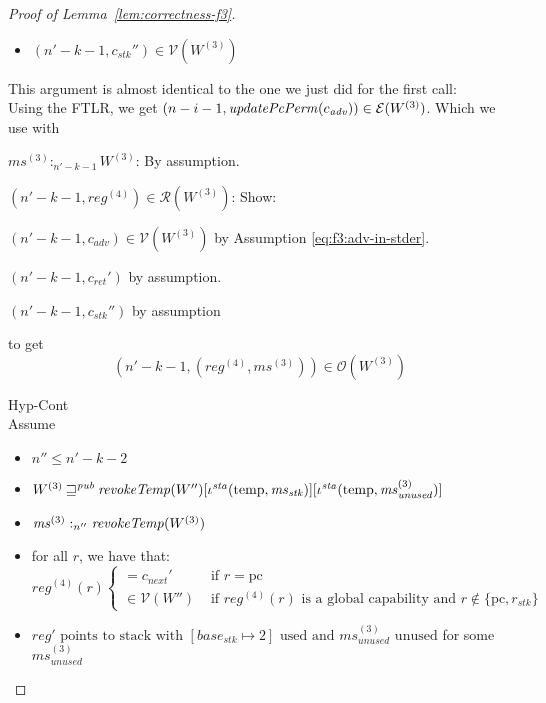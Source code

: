 \documentclass[a4paper]{article}
\newcommand{\var}[1]{\mathit{#1}}
\newcommand{\hs}{\var{ms}}
\newcommand{\ms}{\hs}
\newcommand{\pcreg}{\mathrm{pc}}
\newcommand{\start}{\var{base}}
\newcommand{\reg}{\var{reg}}
\newcommand{\heap}{\var{mem}}
\newcommand{\adv}{\var{adv}}
\newcommand{\stk}{\var{stk}}
\newcommand{\sta}{\var{sta}}
\newcommand{\plainfun}[2]{
  \ifthenelse{\equal{#2}{}}
  {\mathit{#1}}
  {\mathit{#1}(#2)}
}
\newcommand{\updatePcPerm}[1]{\plainfun{updatePcPerm}{#1}}
\newcommand{\revokeTemp}[1]{\plainfun{revokeTemp}{#1}}
\newcommand{\futurewk}{\mathbin{\sqsupseteq}^{\var{pub}}}
\newcommand{\heapSat}[3][\heap]{#1 :_{#2} #3}
\newcommand{\memSat}[3][n]{\heapSat[#2]{#1}{#3}}
\newcommand{\asmType}{\plaindom{AsmType}}
\newcommand{\plaindom}[1]{\mathrm{#1}}
\newcommand{\intr}[2]{\mathcal{#1}}
\newcommand{\valueintr}[1]{\intr{V}{#1}}
\newcommand{\exprintr}[1]{\intr{E}{#1}}
\newcommand{\regintr}[1]{\intr{R}{#1}}
\newcommand{\stdvr}{\valueintr{\asmType}}
\newcommand{\stder}{\exprintr{\asmType}}
\newcommand{\stdrr}{\regintr{\asmType}}
\newcommand{\observations}{\mathcal{O}}
\newcommand{\npair}[2][n]{\left(#1,#2 \right)}
\newcommand{\plainview}[1]{\mathrm{#1}}
\newcommand{\temp}{\plainview{temp}}
\begin{document}
\begin{proof}[Proof of Lemma~\ref{lem:correctness-f3}]
\begin{enumproof}
\begin{enumproof}
\begin{enumproof}
\begin{enumproof}
\begin{itemize}
            \item $(n'-k-1,c_\stk'') \in \stdvr(W^{(3)})$
            \end{itemize}
            This argument is almost identical to the one we just did for the first call:\\
            Using the FTLR, we get $\npair[n-i-1]{\updatePcPerm{c_\adv}} \in \stder(W^{(3)})$. Which we use with
            \begin{enumproof}
              \item $\memSat[n'-k-1]{\ms^{(3)}}{W^{(3)}}$: By assumption.
              \item $\npair[n'-k-1]{\reg^{(4)}} \in \stdrr(W^{(3)})$: Show:
                \begin{enumproof}
                  \item $\npair[n'-k-1]{c_\adv} \in \stdvr(W^{(3)})$ by Assumption \ref{eq:f3:adv-in-stder}.
                  \item $\npair[n'-k-1]{c_{\mathit{ret}}'}$ by assumption.
                  \item $\npair[n'-k-1]{c_\stk''}$ by assumption
                \end{enumproof}
            \end{enumproof}
            to get
            \[
              \npair[n'-k-1]{(\reg^{(4)},\ms^{(3)})} \in \observations(W^{(3)})
            \]
          \item Hyp-Cont\\
            Assume
            \begin{itemize}
            \item $n'' \leq n'-k-2$
            \item $W^{(3)} \futurewk \revokeTemp{W''}[\iota^{\sta}(\temp,\ms_\stk)][\iota^\sta(\temp,\ms_{\mathit{unused}}^{(3)})]$
            \item $\memSat[n'']{\ms^{(3)}}{\revokeTemp{W^{(3)}}}$ 
            \item for all $r$, we have that:
              \begin{equation*}
                \reg^{(4)}(r)
                \begin{cases}
                  = c_{\mathit{next}}' &\text{ if } r = \pcreg\\
                  \in \stdvr(W'') &\text{ if $\reg^{(4)}(r)$ is a global capability and } r \not\in \{\pcreg, r_\stk\}
                \end{cases}
              \end{equation*}
            \item $\reg' \text{ points to stack with $[\start_\stk \mapsto 2]$ used and $\ms_{\mathit{unused}}^{(3)}$ unused}$ for some $\ms_{\mathit{unused}}^{(3)}$

\end{itemize}
\end{enumproof}
\end{enumproof}
\end{enumproof}
\end{enumproof}
\end{proof}
\end{document}
